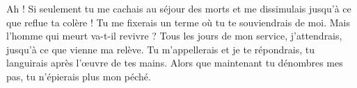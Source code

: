 Ah ! Si seulement tu me cachais au séjour des morts et me dissimulais jusqu’à ce que reflue ta colère ! Tu me fixerais un terme où tu te souviendrais de moi.
Mais l’homme qui meurt va-t-il revivre ? Tous les jours de mon service, j’attendrais, jusqu’à ce que vienne ma relève.
Tu m’appellerais et je te répondrais, tu languirais après l’œuvre de tes mains.
Alors que maintenant tu dénombres mes pas, tu n’épierais plus mon péché.